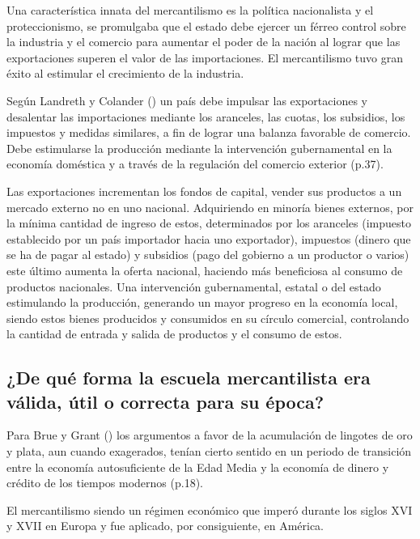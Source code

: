 \documentclass[
  stu,
  floatsintext,
  longtable,
  a4paper,
  nolmodern,
  notxfonts,
  notimes,
  12pt,
  colorlinks=true,linkcolor=blue,citecolor=blue,urlcolor=blue]{apa7}
\begin{document}
Una característica innata del mercantilismo es la política nacionalista
y el proteccionismo, se promulgaba que el estado debe ejercer un férreo
control sobre la industria y el comercio para aumentar el poder de la
nación al lograr que las exportaciones superen el valor de las
importaciones. El mercantilismo tuvo gran éxito al estimular el
crecimiento de la industria.

Según Landreth y Colander
() un país debe
impulsar las exportaciones y desalentar las importaciones mediante los
aranceles, las cuotas, los subsidios, los impuestos y medidas similares,
a fin de lograr una balanza favorable de comercio. Debe estimularse la
producción mediante la intervención gubernamental en la economía
doméstica y a través de la regulación del comercio exterior (p.37).

Las exportaciones incrementan los fondos de capital, vender sus
productos a un mercado externo no en uno nacional. Adquiriendo en
minoría bienes externos, por la mínima cantidad de ingreso de estos,
determinados por los aranceles (impuesto establecido por un país
importador hacia uno exportador), impuestos (dinero que se ha de pagar
al estado) y subsidios (pago del gobierno a un productor o varios) este
último aumenta la oferta nacional, haciendo más beneficiosa al consumo
de productos nacionales. Una intervención gubernamental, estatal o del
estado estimulando la producción, generando un mayor progreso en la
economía local, siendo estos bienes producidos y consumidos en su
círculo comercial, controlando la cantidad de entrada y salida de
productos y el consumo de estos.

\subsection{¿De qué forma la escuela mercantilista era válida, útil o
correcta para su
época?}\label{de-quuxe9-forma-la-escuela-mercantilista-era-vuxe1lida-uxfatil-o-correcta-para-su-uxe9poca}

Para Brue y Grant
() los
argumentos a favor de la acumulación de lingotes de oro y plata, aun
cuando exagerados, tenían cierto sentido en un periodo de transición
entre la economía autosuficiente de la Edad Media y la economía de
dinero y crédito de los tiempos modernos (p.18).

El mercantilismo siendo un régimen económico que imperó durante los
siglos XVI y XVII en Europa y fue aplicado, por consiguiente, en
América.
\end{document}
